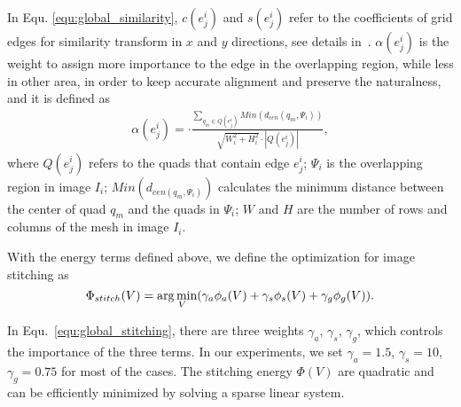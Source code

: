 \documentclass[10pt,journal,compsoc]{IEEEtran}
\begin{document}
In Equ. \ref{equ:global_similarity}, $c(e^i_j)$ and $s(e^i_j)$ refer to the coefficients of  grid edges for similarity transform in $x$ and $y$ directions, see details in~\cite{journals/jgtools/IgarashiI09}. $\alpha(e^i_j)$ is the weight to assign more importance to the edge in the overlapping region, while less in other area, in order to keep accurate alignment and preserve the naturalness, and it is defined as
\begin{equation} \label{equ:global_weight}
\begin{split}
    \alpha(e^i_j)= \cdot \frac{\sum\limits_{q_m\in Q(e^i_j)}Min(d_{cen}(q_m, \Psi_i))}{\sqrt {W_i^2+H_i^2}\cdot |Q(e^i_j)|},
\end{split}
\end{equation}
where $Q(e^i_j)$ refers to the quads that contain edge $e^i_j$;
$\Psi_i$ is the overlapping region in image $I_i$;
$Min(d_{cen(q_m, \Psi_i)})$ calculates the minimum distance between the center of quad $q_m$ and the quads in $\Psi_i$;
$W$ and $H$ are the number of rows and columns of the mesh in image $I_i$.

With the energy terms defined above, we define the optimization for image stitching as
\begin{equation} \label{equ:global_stitching}
 \Phi_{stitch}(V)=\arg \min_{\hspace{-0.10in}V}(\gamma_a \phi_a(V)+\gamma_s \phi_s(V)+\gamma_g \phi_g(V)).
\end{equation}

In Equ.~\ref{equ:global_stitching}, there are three weights $\gamma_a$, $\gamma_s$, $\gamma_g$, which controls the importance of the three terms. 
In our experiments, we set $\gamma_a=1.5$, $\gamma_s=10$, $\gamma_g=0.75$ for most of the cases. 
The stitching energy $\Phi(V)$ are quadratic and can be efficiently minimized by solving a sparse linear system.
\end{document}
